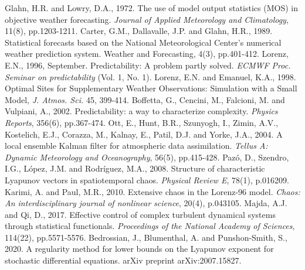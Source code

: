 \documentclass[10pt]{article}
\begin{document}
\begin{thebibliography}{99}

 Glahn, H.R. and Lowry, D.A., 1972. The use of model output statistics (MOS) in objective weather forecasting. {\em Journal of Applied Meteorology and Climatology}, 11(8), pp.1203-1211.
 Carter, G.M., Dallavalle, J.P. and Glahn, H.R., 1989. Statistical forecasts based on the National Meteorological Center's numerical weather prediction system. Weather and Forecasting, 4(3), pp.401-412.
 Lorenz, E.N., 1996, September. Predictability: A problem partly solved. {\em ECMWF Proc. Seminar on predictability} (Vol. 1, No. 1).
 Lorenz, E.N. and Emanuel, K.A., 1998. Optimal Sites for Supplementary Weather Observations: Simulation with a Small Model, {\em J. Atmos. Sci.} 45, 399-414.
 Boffetta, G., Cencini, M., Falcioni, M. and Vulpiani, A., 2002. Predictability: a way to characterize complexity. {\em Physics Reports}, 356(6), pp.367-474.
 Ott, E., Hunt, B.R., Szunyogh, I., Zimin, A.V., Kostelich, E.J., Corazza, M., Kalnay, E., Patil, D.J. and Yorke, J.A., 2004. A local ensemble Kalman filter for atmospheric data assimilation. {\em Tellus A: Dynamic Meteorology and Oceanography}, 56(5), pp.415-428.
 Paz\'o, D., Szendro, I.G., L\'opez, J.M. and Rodríguez, M.A., 2008. Structure of characteristic Lyapunov vectors in spatiotemporal chaos. {\em Physical Review E}, 78(1), p.016209.
 Karimi, A. and Paul, M.R., 2010. Extensive chaos in the Lorenz-96 model. {\em Chaos: An interdisciplinary journal of nonlinear science}, 20(4), p.043105.
 Majda, A.J. and Qi, D., 2017. Effective control of complex turbulent dynamical systems through statistical functionals. {\em Proceedings of the National Academy of Sciences}, 114(22), pp.5571-5576.
 Bedrossian, J., Blumenthal, A. and Punshon-Smith, S., 2020. A regularity method for lower bounds on the Lyapunov exponent for stochastic differential equations. arXiv preprint arXiv:2007.15827.
\end{thebibliography}
\end{document}
